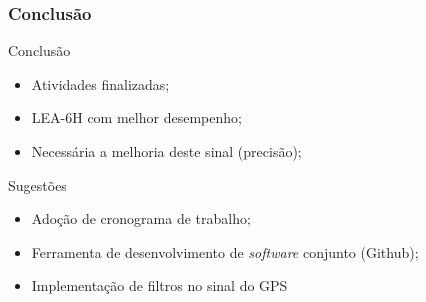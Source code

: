 \begin{frame}
\frametitle{Conclusão}

\begin{block}{Conclusão}
\begin{itemize}
\item Atividades finalizadas;
\item LEA-6H com melhor desempenho;
\item Necessária a melhoria deste sinal (precisão);
\end{itemize}
\end{block}

\begin{block}{Sugestões}
\begin{itemize}
\item Adoção de cronograma de trabalho;
\item Ferramenta de desenvolvimento de \textit{software} conjunto (Github);
\item Implementação de filtros no sinal do GPS
\end{itemize}
\end{block}

\end{frame}

